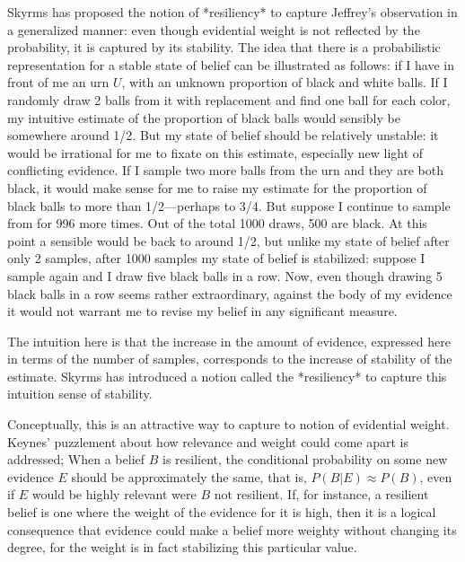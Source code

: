 Skyrms has proposed the notion of *resiliency* to capture Jeffrey's
observation in a generalized manner: even though evidential weight is
not reflected by the probability, it is captured by its stability. The
idea that there is a probabilistic representation for a stable state of
belief can be illustrated as follows: if I have in front of me an urn
\(U\), with an unknown proportion of black and white balls. If I
randomly draw 2 balls from it with replacement and find one ball for
each color, my intuitive estimate of the proportion of black balls would
sensibly be somewhere around 1/2. But my state of belief should be
relatively unstable: it would be irrational for me to fixate on this
estimate, especially new light of conflicting evidence. If I sample two
more balls from the urn and they are both black, it would make sense for
me to raise my estimate for the proportion of black balls to more than
1/2---perhaps to 3/4. But suppose I continue to sample from for 996 more
times. Out of the total 1000 draws, 500 are black. At this point a
sensible would be back to around 1/2, but unlike my state of belief
after only 2 samples, after 1000 samples my state of belief is
stabilized: suppose I sample again and I draw five black balls in a row.
Now, even though drawing 5 black balls in a row seems rather
extraordinary, against the body of my evidence it would not warrant me
to revise my belief in any significant measure.

The intuition here is that the increase in the amount of evidence,
expressed here in terms of the number of samples, corresponds to the
increase of stability of the estimate. Skyrms has introduced a notion
called the *resiliency* to capture this intuition sense of stability.

Conceptually, this is an attractive way to capture to notion of
evidential weight. Keynes' puzzlement about how relevance and weight
could come apart is addressed; When a belief \(B\) is resilient, the
conditional probability on some new evidence \(E\) should be
approximately the same, that is, \(P(B|E) \approx P(B)\), even if \(E\)
would be highly relevant were \(B\) not resilient. If, for instance, a
resilient belief is one where the weight of the evidence for it is high,
then it is a logical consequence that evidence could make a belief more
weighty without changing its degree, for the weight is in fact
stabilizing this particular value.


